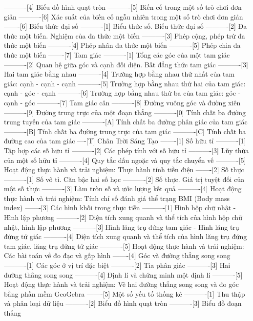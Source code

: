 ----------[4] Biểu đồ hình quạt tròn
----------[5] Biến cố trong một số trò chơi đơn giản
----------[6] Xác suất của biến cố ngẫu nhiên trong một số trò chơi đơn giản
-------[6] Biểu thức đại số
----------[1] Biểu thức số. Biểu thức đại số
----------[2] Đa thức một biến. Nghiệm của đa thức một biến
----------[3] Phép cộng, phép trừ đa thức một biến
----------[4] Phép nhân đa thức một biến
----------[5] Phép chia đa thức một biến
-------[7] Tam giác
----------[1] Tổng các góc của một tam giác
----------[2] Quan hệ giữa góc và cạnh đối diện. Bất đẳng thức tam giác
----------[3] Hai tam giác bằng nhau
----------[4] Trường hợp bằng nhau thứ nhất của tam giác: cạnh - cạnh - cạnh
----------[5] Trường hợp bằng nhau thứ hai của tam giác: cạnh - góc - cạnh
----------[6] Trường hợp bằng nhau thứ ba của tam giác: góc - cạnh - góc
----------[7] Tam giác cân
----------[8] Đường vuông góc và đường xiên
----------[9] Đường trung trực của một đoạn thẳng
----------[0] Tính chất ba đường trung tuyến của tam giác
----------[A] Tính chất ba đường phân giác của tam giác
----------[B] Tính chất ba đường trung trực của tam giác
----------[C] Tính chất ba đường cao của tam giác
----[T] Chân Trời Sáng Tạo
-------[1] Số hữu tỉ
----------[1] Tập hợp các số hữu tỉ
----------[2] Các phép tính với số hữu tỉ
----------[3] Lũy thừa của một số hữu tỉ
----------[4] Quy tắc dấu ngoặc và quy tắc chuyển vế
----------[5] Hoạt động thực hành và trải nghiệm: Thực hành tính tiền điện
-------[2] Số thực
----------[1] Số vô tỉ. Căn bậc hai số học
----------[2] Số thực. Giá trị tuyệt đối của một số thực
----------[3] Làm tròn số và ước lượng kết quả
----------[4] Hoạt động thực hành và trải nghiệm: Tính chỉ số đánh giá thể trạng BMI (Body mass index)
-------[3] Các hình khối trong thực tiễn
----------[1] Hình hộp chữ nhật - Hình lập phương
----------[2] Diện tích xung quanh và thể tích của hình hộp chữ nhật, hình lập phương
----------[3] Hình lăng trụ đứng tam giác - Hình lăng trụ đứng tứ giác
----------[4] Diện tích xung quanh và thể tích của hình lăng trụ đứng tam giác, lăng trụ đứng tứ giác
----------[5] Hoạt động thực hành và trải nghiệm: Các bài toán về đo đạc và gấp hình
-------[4] Góc và đường thẳng song song
----------[1] Các góc ở vị trí đặc biệt
----------[2] Tia phân giác
----------[3] Hai đường thẳng song song
----------[4] Định lí và chứng minh một định lí
----------[5] Hoạt động thực hành và trải nghiệm: Vẽ hai đường thẳng song song và đo góc bằng phần mềm GeoGebra
-------[5] Một số yếu tố thống kê
----------[1] Thu thập và phân loại dữ liệu
----------[2] Biểu đồ hình quạt tròn
----------[3] Biểu đồ đoạn thẳng

